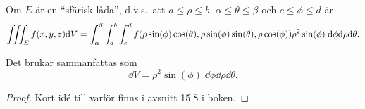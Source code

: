 \documentclass[a4paper]{article}
\begin{document}
\begin{sats}
    Om \(
        E 
    \) är en \enquote{sfärisk låda}, d.v.s.\ att \(
        a \leq \rho \leq b
    \), \(
        \alpha \leq \theta \leq \beta
    \) och \(
        c \leq \phi \leq d
    \) är \[
        \iiint_E f(x,y,z) \dd V = \int_\alpha^\beta \int_a^b \int_c^d f(\rho \sin(\phi)\cos(\theta), \rho \sin(\phi)\sin(\theta), \rho \cos(\phi)) \rho^2 \sin(\phi) \; \dd \phi \dd \rho \dd \theta.
    \] 

    Det brukar sammanfattas som \[
        \dd V = \rho^2 \sin(\phi) \; \dd \phi \dd \rho \dd \theta.
    \] 

    \begin{proof}
        Kort idé till varför finns i avsnitt 15.8 i boken.
    \end{proof}
\end{sats}
\end{document}

